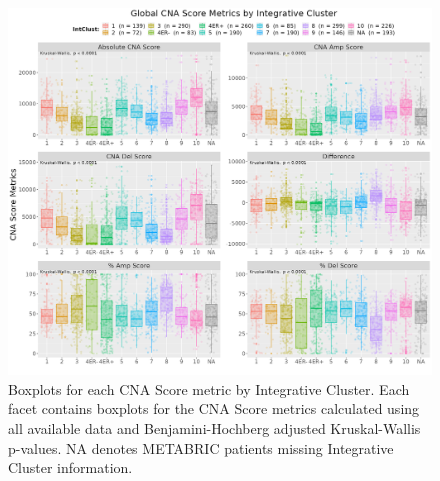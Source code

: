 \begin{figure}[!ht]
\center
\includegraphics[width=1\textwidth]{../figures/Chapter_2/Global_CNA_Score_Metrics_Across_IntClust.png}
\caption[Boxplots for each CNA Score metric by Integrative Cluster.]{Boxplots for each CNA Score metric by Integrative Cluster. Each facet contains boxplots for the CNA Score metrics calculated using all available data and Benjamini-Hochberg adjusted Kruskal-Wallis p-values. NA denotes METABRIC patients missing Integrative Cluster information.}
\label{fig:CNA-Score-Metric-Boxplots-IC}
\end{figure}


